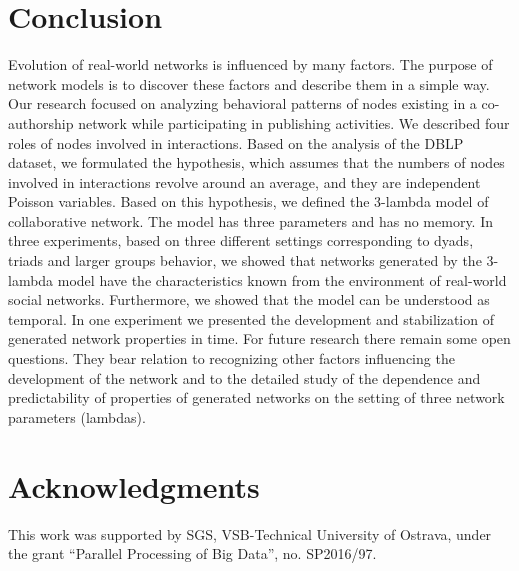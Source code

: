 \documentclass{sig-alternate-05-2015}
\begin{document}






\section{Conclusion}
\label{sec:conc}
Evolution of real-world networks is influenced by many factors. The purpose of network models is to discover these factors and describe them in a simple way. Our research focused on analyzing behavioral patterns of nodes existing in a co-authorship network while participating in publishing activities. We described four roles of nodes involved in interactions. Based on the analysis of the DBLP dataset, we formulated the hypothesis, which assumes that the numbers of nodes involved in interactions revolve around an average, and they are independent Poisson variables. Based on this hypothesis, we defined the 3-lambda model of collaborative network. The model has three parameters and has no memory. In three experiments, based on three different settings corresponding to dyads, triads and larger groups behavior, we showed that networks generated by the 3-lambda model have the characteristics known from the environment of real-world social networks. Furthermore, we showed that the model can be understood as temporal. In one experiment we presented the development and stabilization of generated network properties in time. For future research there remain some open questions. They bear relation to recognizing other factors influencing the development of the network and to the detailed study of the dependence and predictability of properties of generated networks on the setting of three network parameters (lambdas).

\section{Acknowledgments}
This work was supported by SGS, VSB-Technical University of Ostrava, under the grant ``Parallel Processing of Big Data'', no. SP2016/97.


%

\balancecolumns %
\end{document}
